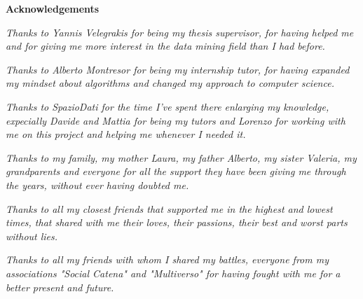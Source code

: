 \thispagestyle{empty}

\begin{center}
  {\bf \Huge Acknowledgements}
\end{center}

\vspace{4cm}


\emph{Thanks to Yannis Velegrakis for being my thesis supervisor, for having helped me and for giving me more interest in the data mining field than I had before.}


\emph{Thanks to Alberto Montresor for being my internship tutor, for having expanded my mindset about algorithms and changed my approach to computer science.}


\emph{Thanks to SpazioDati for the time I've spent there enlarging my knowledge, expecially Davide and Mattia for being my tutors and Lorenzo for working with me on this project and helping me whenever I needed it.}


\emph{Thanks to my family, my mother Laura, my father Alberto, my sister Valeria, my grandparents and everyone for all the support they have been giving me through the years, without ever having doubted me.}


\emph{Thanks to all my closest friends that supported me in the highest and lowest times, that shared with me their loves, their passions, their best and worst parts without lies.}


\emph{Thanks to all my friends with whom I shared my battles, everyone from my associations "Social Catena" and "Multiverso" for having fought with me for a better present and future.
}
